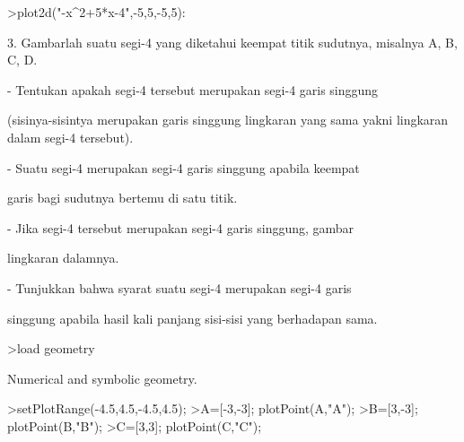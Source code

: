 \documentclass[a4paper,10pt]{article}
\begin{document}
\begin{eulernotebook}
\begin{eulercomment}
\begin{eulercomment}
\begin{eulercomment}
\begin{eulercomment}
\begin{eulercomment}
\begin{eulercomment}
\begin{eulercomment}
\begin{eulercomment}
\begin{eulercomment}
\begin{eulercomment}
\begin{eulercomment}
\begin{eulercomment}
\begin{eulercomment}
\begin{eulercomment}
\begin{eulercomment}
\begin{eulercomment}
\begin{eulercomment}
\begin{eulercomment}
\begin{euleroutput}
\end{euleroutput}
\begin{eulerprompt}
>plot2d("-x^2+5*x-4",-5,5,-5,5):
\end{eulerprompt}
\begin{eulercomment}
3. Gambarlah suatu segi-4 yang diketahui keempat titik sudutnya,
misalnya A, B, C, D.\\
\end{eulercomment}
\begin{eulerttcomment}
   - Tentukan apakah segi-4 tersebut merupakan segi-4 garis singgung
\end{eulerttcomment}
\begin{eulercomment}
(sisinya-sisintya merupakan garis singgung lingkaran yang sama yakni
lingkaran dalam segi-4 tersebut).\\
\end{eulercomment}
\begin{eulerttcomment}
   - Suatu segi-4 merupakan segi-4 garis singgung apabila keempat
\end{eulerttcomment}
\begin{eulercomment}
garis bagi sudutnya bertemu di satu titik.\\
\end{eulercomment}
\begin{eulerttcomment}
   - Jika segi-4 tersebut merupakan segi-4 garis singgung, gambar
\end{eulerttcomment}
\begin{eulercomment}
lingkaran dalamnya.\\
\end{eulercomment}
\begin{eulerttcomment}
   - Tunjukkan bahwa syarat suatu segi-4 merupakan segi-4 garis
\end{eulerttcomment}
\begin{eulercomment}
singgung apabila hasil kali panjang sisi-sisi yang berhadapan sama.
\end{eulercomment}
\begin{eulerprompt}
>load geometry
\end{eulerprompt}
\begin{euleroutput}
  Numerical and symbolic geometry.
\end{euleroutput}
\begin{eulerprompt}
>setPlotRange(-4.5,4.5,-4.5,4.5);
>A=[-3,-3]; plotPoint(A,"A");
>B=[3,-3]; plotPoint(B,"B");
>C=[3,3]; plotPoint(C,"C");

\end{eulerprompt}
\end{eulercomment}
\end{eulercomment}
\end{eulercomment}
\end{eulercomment}
\end{eulercomment}
\end{eulercomment}
\end{eulercomment}
\end{eulercomment}
\end{eulercomment}
\end{eulercomment}
\end{eulercomment}
\end{eulercomment}
\end{eulercomment}
\end{eulercomment}
\end{eulercomment}
\end{eulercomment}
\end{eulercomment}
\end{eulercomment}
\end{eulernotebook}
\end{document}
